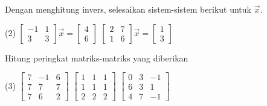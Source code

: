 \begin{exercise}
Dengan menghitung invers,
selesaikan sistem-sistem berikut untuk $\vec{x}$.
\begin{tasks}(2)
\task
$\begin{bmatrix}
-1 & 1 \\
3 & 3
\end{bmatrix} \vec{x} =
\begin{bmatrix} 4 \\ 6 \end{bmatrix}$
\task
$\begin{bmatrix}
2 & 7 \\
1 & 6
\end{bmatrix} \vec{x} =
\begin{bmatrix} 1 \\ 3 \end{bmatrix}$
\end{tasks}
\end{exercise}

\begin{exercise} \label{exercise:rankmatrixans}
Hitung peringkat matriks-matriks yang diberikan
\begin{tasks}(3)
\task
$\begin{bmatrix}
7 & -1 & 6 \\
7 & 7 & 7 \\
7 & 6 & 2
\end{bmatrix}$
\task
$\begin{bmatrix}
1 & 1 & 1 \\
1 & 1 & 1 \\
2 & 2 & 2
\end{bmatrix}$
\task
$\begin{bmatrix}
0 & 3 & -1 \\
6 & 3 & 1 \\
4 & 7 & -1
\end{bmatrix}$
\end{tasks}
\end{exercise}

